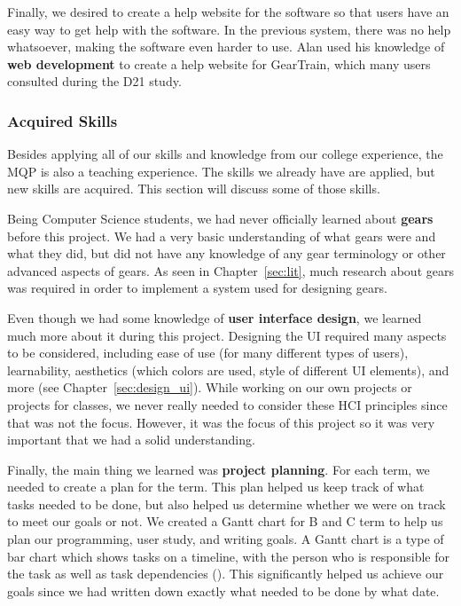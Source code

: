 \begin{doublespace}
Finally, we desired to create a help website for the software so that users have an easy way to get help with the software. In the previous system, there was no help whatsoever, making the software even harder to use. Alan used his knowledge of \textbf{web development} to create a help website for GearTrain, which many users consulted during the D21 study.

\subsubsection{Acquired Skills}
Besides applying all of our skills and knowledge from our college experience, the MQP is also a teaching experience. The skills we already have are applied, but new skills are acquired. This section will discuss some of those skills.

Being Computer Science students, we had never officially learned about \textbf{gears} before this project. We had a very basic understanding of what gears were and what they did, but did not have any knowledge of any gear terminology or other advanced aspects of gears. As seen in Chapter~\ref{sec:lit}, much research about gears was required in order to implement a system used for designing gears.

Even though we had some knowledge of \textbf{user interface design}, we learned much more about it during this project. Designing the UI required many aspects to be considered, including ease of use (for many different types of users), learnability, aesthetics (which colors are used, style of different UI elements), and more (see Chapter~\ref{sec:design_ui}). While working on our own projects or projects for classes, we never really needed to consider these HCI principles since that was not the focus. However, it was the focus of this project so it was very important that we had a solid understanding.

Finally, the main thing we learned was \textbf{project planning}. For each term, we needed to create a plan for the term. This plan helped us keep track of what tasks needed to be done, but also helped us determine whether we were on track to meet our goals or not. We created a Gantt chart for B and C term to help us plan our programming, user study, and writing goals. A Gantt chart is a type of bar chart which shows tasks on a timeline, with the person who is responsible for the task as well as task dependencies (\cite{clark_gantt_1922}). This significantly helped us achieve our goals since we had written down exactly what needed to be done by what date.


\end{doublespace}
